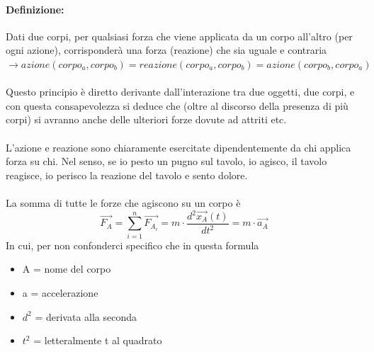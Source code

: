 \documentclass[12pt, a4paper, openany, oneside]{book}
\begin{document}
\paragraph{Definizione: } Dati due corpi, per qualsiasi forza che viene applicata 
da un corpo all'altro (per ogni azione), corrisponderà una forza (reazione) che
sia uguale e contraria $\to azione(corpo_{a}, corpo_{b}) = 
reazione(corpo_{a}, corpo_{b}) = azione(corpo_{b}, corpo_{a})$ \\ \\
Questo principio è diretto derivante dall'interazione tra due oggetti, due corpi,
e con questa consapevolezza si deduce che (oltre al discorso della presenza di
più corpi) si avranno anche delle ulteriori forze dovute ad attriti etc. \\ \\
L'azione e reazione sono chiaramente esercitate dipendentemente da chi applica
forza su chi. Nel senso, se io pesto un pugno sul tavolo, io agisco, il tavolo
reagisce, io perisco la reazione del tavolo e sento dolore.\\ \\
La somma di tutte le forze che agiscono su un corpo è $$\overrightarrow{F_{A}}
= \sum_{i=1}^{n} \overrightarrow{F_{A_{i}}} = m \cdot \frac{d^{2}
\overrightarrow{x_{A}} (t)}{dt^{2}} = m\cdot \overrightarrow{a_{A}}$$ In cui, 
per non confonderci specifico che in questa formula 
\begin{itemize}
	\item A = nome del corpo
	\item a = accelerazione
	\item $d^{2}$ = derivata alla seconda
	\item $t^{2}$ = letteralmente t al quadrato
\end{itemize}
\end{document}
